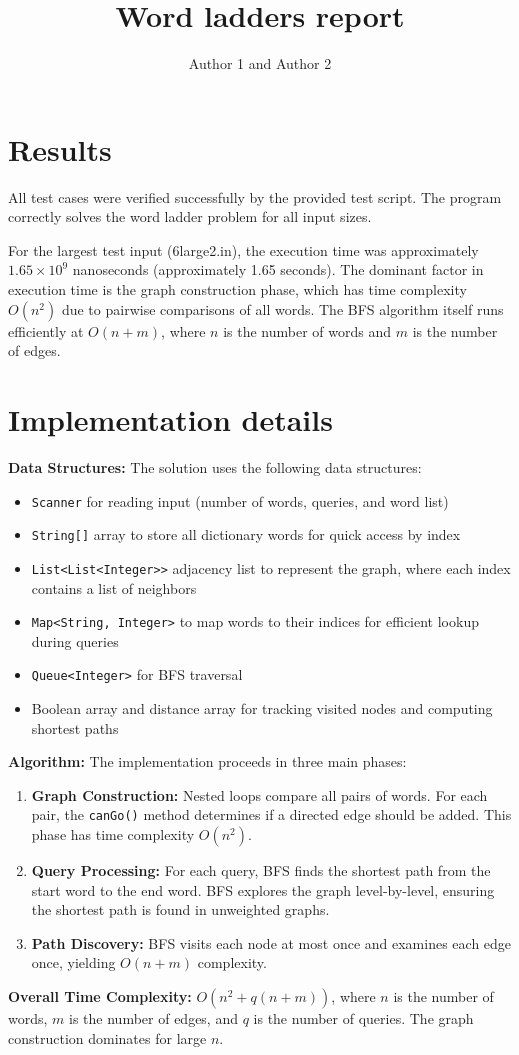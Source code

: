 \documentclass{article}
\title{Word ladders report}
\author{Author 1 and Author 2}
\begin{document}
  \maketitle

  \section{Results}

  All test cases were verified successfully by the provided test script. The program correctly solves the word ladder problem for all input sizes.

  For the largest test input (6large2.in), the execution time was approximately $1.65 \times 10^{9}$ nanoseconds (approximately 1.65 seconds). The dominant factor in execution time is the graph construction phase, which has time complexity $O(n^2)$ due to pairwise comparisons of all words. The BFS algorithm itself runs efficiently at $O(n + m)$, where $n$ is the number of words and $m$ is the number of edges.

  \section{Implementation details}

  \textbf{Data Structures:} The solution uses the following data structures:
  \begin{itemize}
    \item \texttt{Scanner} for reading input (number of words, queries, and word list)
    \item \texttt{String[]} array to store all dictionary words for quick access by index
    \item \texttt{List<List<Integer>>} adjacency list to represent the graph, where each index contains a list of neighbors
    \item \texttt{Map<String, Integer>} to map words to their indices for efficient lookup during queries
    \item \texttt{Queue<Integer>} for BFS traversal
    \item Boolean array and distance array for tracking visited nodes and computing shortest paths
  \end{itemize}

  \textbf{Algorithm:} The implementation proceeds in three main phases:
  \begin{enumerate}
    \item \textbf{Graph Construction:} Nested loops compare all pairs of words. For each pair, the \texttt{canGo()} method determines if a directed edge should be added. This phase has time complexity $O(n^2)$.
    \item \textbf{Query Processing:} For each query, BFS finds the shortest path from the start word to the end word. BFS explores the graph level-by-level, ensuring the shortest path is found in unweighted graphs.
    \item \textbf{Path Discovery:} BFS visits each node at most once and examines each edge once, yielding $O(n + m)$ complexity.
  \end{enumerate}

  \textbf{Overall Time Complexity:} $O(n^2 + q(n + m))$, where $n$ is the number of words, $m$ is the number of edges, and $q$ is the number of queries. The graph construction dominates for large $n$.
\end{document}
